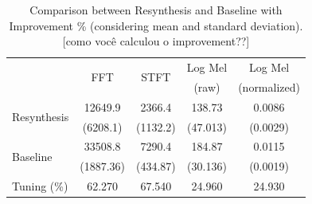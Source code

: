 \documentclass[10pt,conference]{IEEEtran}
\newcommand{\basg}[1]{{\color{blue}[#1]}}
\begin{document}
\begin{table}[htb] \small %
  \caption{Comparison between Resynthesis and Baseline with Improvement \% (considering mean and standard deviation). \basg{como você calculou o improvement??}}
  \label{tab:metrics}
\begin{tabular*}{\columnwidth}
	{@{\extracolsep{\fill}}lcccc}
        \toprule
        & \multirow{2}{*}{FFT} & \multirow{2}{*}{STFT} & Log Mel & Log Mel \\ 
        & & & (raw) & (normalized) \\
        
        \midrule
        \multirow{2}{*}{Resynthesis} & 12649.9 & 2366.4 & 138.73 & 0.0086 \\
        & (6208.1) & (1132.2) & (47.013) & (0.0029) \\ 
        \multirow{2}{*}{Baseline} & 33508.8 & 7290.4 & 184.87 & 0.0115 \\
        & (1887.36) & (434.87) & (30.136) & (0.0019) \\
        \midrule
        Tuning (\%) & 62.270 & 67.540 & 24.960 & 24.930 \\
        \bottomrule
    \end{tabular*}
    \label{tab:metrics}
\end{table}


\end{document}
